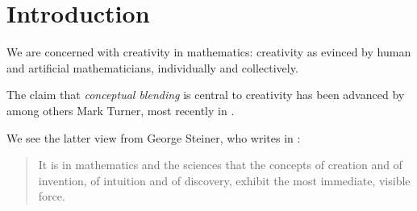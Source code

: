 \section{Introduction}
\label{sec:intro}

We are concerned with creativity in mathematics: creativity
as evinced by human and artificial mathematicians,
individually and collectively.

The claim that \emph{conceptual blending} is central to creativity
has been advanced by among others Mark Turner, most recently
in \textcite{MTurner14}.

We see the latter view from George Steiner, who writes in 
\citet[p~145]{Ste01}:
\begin{quote}
  It is in mathematics and the sciences that the concepts of
creation and of invention, of intuition and of discovery,
exhibit the most immediate, visible force.
\end{quote}

